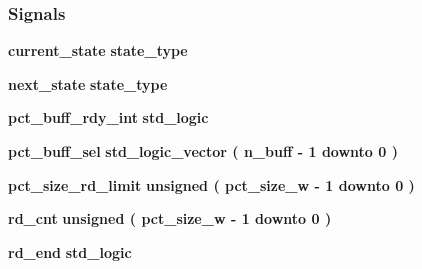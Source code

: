\subsubsection*{Signals}
 \begin{DoxyCompactItemize}
\item 
{\bf current\+\_\+state} {\bfseries {\bfseries {\bf state\+\_\+type}} \textcolor{vhdlchar}{ }} 
\item 
{\bf next\+\_\+state} {\bfseries {\bfseries {\bf state\+\_\+type}} \textcolor{vhdlchar}{ }} 
\item 
{\bf pct\+\_\+buff\+\_\+rdy\+\_\+int} {\bfseries \textcolor{comment}{std\+\_\+logic}\textcolor{vhdlchar}{ }} 
\item 
{\bf pct\+\_\+buff\+\_\+sel} {\bfseries \textcolor{comment}{std\+\_\+logic\+\_\+vector}\textcolor{vhdlchar}{ }\textcolor{vhdlchar}{(}\textcolor{vhdlchar}{ }\textcolor{vhdlchar}{ }\textcolor{vhdlchar}{ }\textcolor{vhdlchar}{ }{\bfseries {\bf n\+\_\+buff}} \textcolor{vhdlchar}{-\/}\textcolor{vhdlchar}{ } \textcolor{vhdldigit}{1} \textcolor{vhdlchar}{ }\textcolor{keywordflow}{downto}\textcolor{vhdlchar}{ }\textcolor{vhdlchar}{ } \textcolor{vhdldigit}{0} \textcolor{vhdlchar}{ }\textcolor{vhdlchar}{)}\textcolor{vhdlchar}{ }} 
\item 
{\bf pct\+\_\+size\+\_\+rd\+\_\+limit} {\bfseries \textcolor{comment}{unsigned}\textcolor{vhdlchar}{ }\textcolor{vhdlchar}{(}\textcolor{vhdlchar}{ }\textcolor{vhdlchar}{ }\textcolor{vhdlchar}{ }\textcolor{vhdlchar}{ }{\bfseries {\bf pct\+\_\+size\+\_\+w}} \textcolor{vhdlchar}{-\/}\textcolor{vhdlchar}{ } \textcolor{vhdldigit}{1} \textcolor{vhdlchar}{ }\textcolor{keywordflow}{downto}\textcolor{vhdlchar}{ }\textcolor{vhdlchar}{ } \textcolor{vhdldigit}{0} \textcolor{vhdlchar}{ }\textcolor{vhdlchar}{)}\textcolor{vhdlchar}{ }} 
\item 
{\bf rd\+\_\+cnt} {\bfseries \textcolor{comment}{unsigned}\textcolor{vhdlchar}{ }\textcolor{vhdlchar}{(}\textcolor{vhdlchar}{ }\textcolor{vhdlchar}{ }\textcolor{vhdlchar}{ }\textcolor{vhdlchar}{ }{\bfseries {\bf pct\+\_\+size\+\_\+w}} \textcolor{vhdlchar}{-\/}\textcolor{vhdlchar}{ } \textcolor{vhdldigit}{1} \textcolor{vhdlchar}{ }\textcolor{keywordflow}{downto}\textcolor{vhdlchar}{ }\textcolor{vhdlchar}{ } \textcolor{vhdldigit}{0} \textcolor{vhdlchar}{ }\textcolor{vhdlchar}{)}\textcolor{vhdlchar}{ }} 
\item 
{\bf rd\+\_\+end} {\bfseries \textcolor{comment}{std\+\_\+logic}\textcolor{vhdlchar}{ }} 
\end{DoxyCompactItemize}


